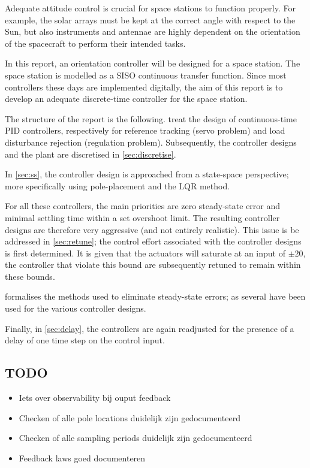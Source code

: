 Adequate attitude control is crucial for space stations to function properly. For example, the solar arrays must be kept at the correct angle with respect to the Sun, but also instruments and antennae are highly dependent on the orientation of the spacecraft to perform their intended tasks.

In this report, an orientation controller will be designed for a space station. The space station is modelled as a SISO continuous transfer function. Since most controllers these days are implemented digitally, the aim of this report is to develop an adequate discrete-time controller for the space station.

The structure of the report is the following.  treat the design of continuous-time PID controllers, respectively for reference tracking (servo problem) and load disturbance rejection (regulation problem). Subsequently, the controller designs and the plant are discretised in \cref{sec:discretise}. 

In \cref{sec:ss}, the controller design is approached from a state-space perspective; more specifically using pole-placement and the LQR method.

For all these controllers, the main priorities are zero steady-state error and minimal settling time within a set overshoot limit. The resulting controller designs are therefore very aggressive (and not entirely realistic). This issue is be addressed in \cref{sec:retune}; the control effort associated with the controller designs is first determined. It is given that the actuators will saturate at an input of $\pm20$, the controller that violate this bound are subsequently retuned to remain within these bounds.

 formalises the methods used to eliminate steady-state errors; as several have been used for the various controller designs. 

Finally, in \cref{sec:delay}, the controllers are again readjusted for the presence of a delay of one time step on the control input.

\subsection*{TODO}
\begin{itemize}
    \item Iets over observability bij ouput feedback
    \item Checken of alle pole locations duidelijk zijn gedocumenteerd
    \item Checken of alle sampling periods duidelijk zijn gedocumenteerd
    \item Feedback laws goed documenteren
\end{itemize}
